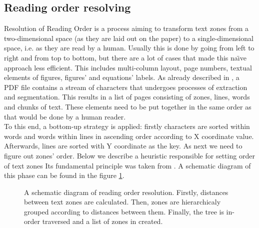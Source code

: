 \subsection{Reading order resolving}\label{sec:readin_order}
Resolution of Reading Order is a process aiming to transform text zones from a two-dimensional space (as they are laid out on the paper) to a single-dimensional space, i.e. as they are read by a human. Usually this is done by going from left to right and from top to bottom, but there are a lot of cases that made this na\"\i ve approach less efficient. This includes multi-column layout, page numbers, textual elements of figures, figures' and equations' labels.
\qquad
As already described in \cite{DominikaTkaczykPaweSzostekMateuszFedoryszakPiotrJanDendek2014}, a PDF file contains a stream of characters that undergoes processes of extraction and segmentation. This results in a list of pages consisting of zones, lines, words and chunks of text. These elements need to be put together in the same order as that would be done by a human reader.\\
To this end, a bottom-up strategy is applied: firstly characters are sorted within words and words within lines in ascending order according to X coordinate value. Afterwards, lines are sorted with Y coordinate as the key. As next we need to figure out zones' order. Below we describe a heuristic responsible for setting order of text zones Its fundamental principle was taken from \cite{ROR_source}. A schematic diagram of this phase can be found in the figure \ref{fig:reading_order}.
\begin{figure}[]
  \centering
  
  \caption{A schematic diagram of reading order resolution. Firstly, distances between text zones are calculated. Then, zones are hierarchicaly grouped according to distances between them. Finally, the tree is in-order traversed and a list of zones in created.}
  \label{fig:reading_order}
\end{figure}
